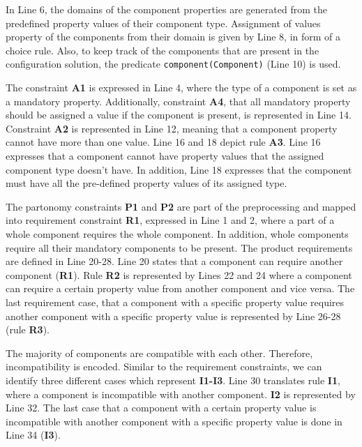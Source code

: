 In Line 6, the domains of the component properties are generated from the predefined property values of their component type.
Assignment of values property of the components from their domain is given by Line 8, in form of a choice rule.
Also, to keep track of the components that are present in the configuration solution, the predicate \texttt{component(Component)} (Line 10) is used. \newline

The constraint \textbf{A1} is expressed in Line 4, where the type of a component is set as a mandatory property.
Additionally, constraint \textbf{A4}, that all mandatory property should be assigned a value if the component is present, is represented in Line 14. 
Constraint \textbf{A2} is represented in Line 12, meaning that a component property cannot have more than one value.
Line 16 and 18 depict rule \textbf{A3}. 
Line 16 expresses that a component cannot have property values that the assigned component type doesn't have.
In addition, Line 18 expresses that the component must have all the pre-defined property values of its assigned type. \newline

The partonomy constraints \textbf{P1} and \textbf{P2} are part of the preprocessing and mapped into requirement constraint \textbf{R1}, expressed in Line 1 and 2, where a part of a whole component requires the whole component. In addition, whole components require all their mandatory components to be present.
The product requirements are defined in Line 20-28. Line 20 states that a component can require another component (\textbf{R1}). Rule \textbf{R2} is represented by Lines 22 and 24 where a component can require a certain property value from another component and vice versa. The last requirement case, that a component with a specific property value requires another component with a specific property value is represented by Line 26-28 (rule \textbf{R3}). \newline

The majority of components are compatible with each other. Therefore, incompatibility is encoded. Similar to the requirement constraints, we can identify three different cases which represent \textbf{I1-I3}. Line 30 translates rule \textbf{I1}, where a component is incompatible with another component. \textbf{I2} is represented by Line 32. The last case that a component with a certain property value is incompatible with another component with a specific property value is done in Line 34 (\textbf{I3}). \newline

